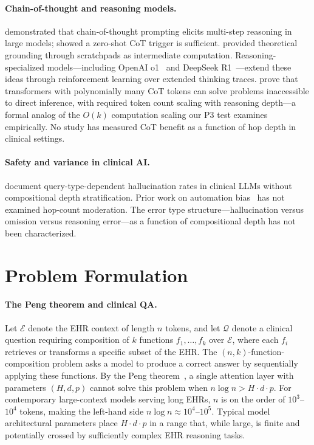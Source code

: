 \documentclass{article}
\begin{document}
\paragraph{Chain-of-thought and reasoning models.}
\citet{wei2022chain} demonstrated that chain-of-thought prompting elicits multi-step reasoning in large models; \citet{kojima2022large} showed a zero-shot CoT trigger is sufficient. \citet{nye2021show} provided theoretical grounding through scratchpads as intermediate computation. Reasoning-specialized models---including OpenAI o1~\citep{openai2024o1} and DeepSeek R1~\citep{deepseekr1_2025}---extend these ideas through reinforcement learning over extended thinking traces. \citet{merrill2024expressive} prove that transformers with polynomially many CoT tokens can solve problems inaccessible to direct inference, with required token count scaling with reasoning depth---a formal analog of the $O(k)$ computation scaling our P3 test examines empirically. No study has measured CoT benefit as a function of hop depth in clinical settings.

\paragraph{Safety and variance in clinical AI.}
\citet{noharm2025} document query-type-dependent hallucination rates in clinical LLMs without compositional depth stratification. Prior work on automation bias~\citep{goddard2012automation,lyell2017automation} has not examined hop-count moderation. The error type structure---hallucination versus omission versus reasoning error---as a function of compositional depth has not been characterized.

\section{Problem Formulation}

\paragraph{The Peng theorem and clinical QA.}
Let $\mathcal{E}$ denote the EHR context of length $n$ tokens, and let
$\mathcal{Q}$ denote a clinical question requiring composition of $k$ functions
$f_1, \ldots, f_k$ over $\mathcal{E}$, where each $f_i$ retrieves or transforms
a specific subset of the EHR.
The $(n, k)$-function-composition problem asks a model to produce a correct
answer by sequentially applying these functions.
By the Peng theorem~\citep{peng2024limitations}, a single attention layer with
parameters $(H, d, p)$ cannot solve this problem when $n \log n > H \cdot d \cdot p$.
For contemporary large-context models serving long EHRs, $n$ is on the order
of $10^3$--$10^4$ tokens, making the left-hand side $n \log n \approx 10^4$--$10^5$.
Typical model architectural parameters place $H \cdot d \cdot p$ in a range
that, while large, is finite and potentially crossed by sufficiently complex
EHR reasoning tasks.
\end{document}
